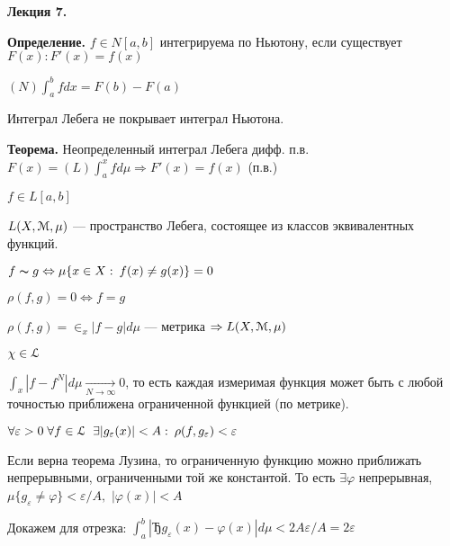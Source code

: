 

\begin{center} \textbf{Лекция 7.} \end{center}


%
%
%
%
%
%
%
%
%
%
%
%

\textbf{Определение.} \quad $f \in N[a, b]$ интегрируема по
Ньютону, если существует $F(x) : F'(x) = f(x)$

$(N) \int_a^b f dx = F(b) - F(a)$

Интеграл Лебега не покрывает интеграл Ньютона.





\textbf{Теорема.} \quad Неопределенный интеграл Лебега дифф. п.в.
$F(x) = (L) \int_a^x f d\mu \Rightarrow F'(x) = f(x)$ (п.в.)

$f \in L[a,b]$

$L (X, \EuScript{M}, \mu)$ --- пространство Лебега, состоящее из
классов эквивалентных функций.

$f \thicksim g \Leftrightarrow \mu\{x \in X: \: f(x) \neq g(x)\} =
0$

$\rho (f, g) = 0 \Leftrightarrow f = g$

$\rho (f,g) = \in_x |f - g| d \mu $ --- метрика $\Rightarrow L(X,
\EuScript{M}, \mu)$

$\chi \in \EuScript{L}$

$\int_x |f - f^N| d \mu \xrightarrow[N \rightarrow \infty]{} 0$,
то есть каждая измеримая функция может быть с любой точностью
приближена ограниченной функцией (по метрике).

$\forall \varepsilon > 0 \; \forall f \in \EuScript{L} \;\;
\exists |g_\varepsilon (x)| < A: \: \rho(f, g_\varepsilon) <
\varepsilon$

Если верна теорема Лузина, то ограниченную функцию можно
приближать непрерывными, ограниченными той же константой. То есть
$\exists \varphi$ непрерывная, $\mu \{g_\varepsilon \neq \varphi\}
< \varepsilon/A, $ $|\varphi(x)| < A$

Докажем для отрезка: $\int_a^b |Ђg_\varepsilon(x) - \varphi(x)| d
\mu < 2A\varepsilon / A = 2\varepsilon$

